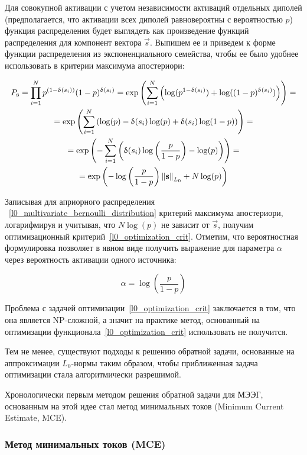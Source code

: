 Для совокупной активации с учетом независимости активаций отдельных диполей
(предполагается, что активации всех диполей равновероятны с вероятностью $p$)
функция распределения будет выглядеть как произведение функций распределения
для компонент вектора $\vec{s}$. Выпишем ее и приведем к форме функции
распределения из экспоненциального семейства, чтобы ее было удобнее использовать
в критерии максимума апостериори:

\begin{multline}
    P_{\mathbf{s}} = \prod_{i=1}^{N} p^{(1-\updelta(s_i))} (1-p)^{\updelta(s_i)}=
    \exp\left(\sum_{i=1}^N \left(\log(p^{1-\updelta(s_i)}) + \log((1-p)^{\updelta(s_i)})\right)\right)=\\
    =\exp\left(\sum_{i=1}^N \left(\log(p) - \updelta(s_i) \log(p) + \updelta(s_i)\log(1-p)\right)\right)=\\
    =\exp\left(-\sum_{i=1}^N \left(\updelta(s_i) \log\left(\frac{p}{1-p}\right) - \log(p)\right)\right) = \\
    =\exp\left(-\log\left(\frac{p}{1-p}\right) \left\lVert\mathbf{s}\right\rVert_{L_0} + N\log(p)\right)
    \label{l0_multivariate_bernoulli_distribution}
\end{multline}

Записывая для априорного распределения
~\ref{l0_multivariate_bernoulli_distribution} критерий максимума апостериори,
логарифмируя и учитывая, что $N\log(p)$ не зависит от $\vec{s}$, получим
оптимизационный критерий~\ref{l0_optimization_crit}. Отметим, что вероятностная
формулировка позволяет в явном виде получить выражение для параметра $\alpha$
через вероятность активации одного источника:

\begin{equation}
    \alpha = \log\left(\frac{p}{1-p}\right)
\end{equation}


Проблема с задачей оптимизации~\ref{l0_optimization_crit} заключается в том,
что она является NP-сложной, а значит на практике метод, основанный на
оптимизации функционала~\ref{l0_optimization_crit} использовать не получится.

Тем не менее, существуют подходы к решению обратной задачи,
основанные на аппроксимации $L_0$-нормы таким образом, чтобы
приближенная задача оптимизации стала алгоритмически разрешимой.

Хронологически первым методом решения обратной задачи для МЭЭГ,
основанным на этой идее стал метод минимальных токов
(Minimum Current Estimate, MCE).

\subsubsection{Метод минимальных токов (MCE)}

